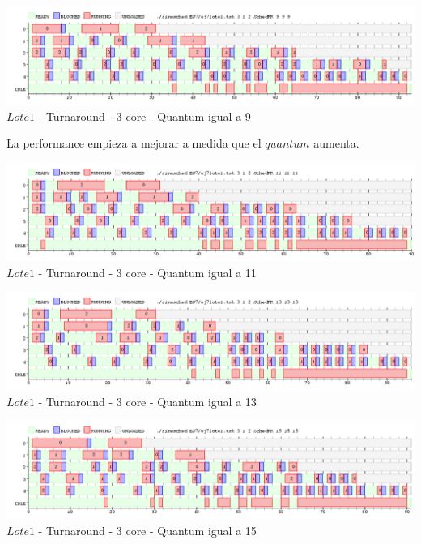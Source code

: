    \begin{center}
    	\includegraphics[width=450pt]{./EJ7/ej7tour3core4quan.png}
	{$Lote 1$ - Turnaround - 3 core - Quantum igual a 9}	
 \end{center}
 
 
 \indent La performance empieza a mejorar a medida que el $quantum$ aumenta.
 
   \begin{center}
    	\includegraphics[width=450pt]{./EJ7/ej7tour3core5quan.png}
	{$Lote 1$ - Turnaround - 3 core - Quantum igual a 11}	
 \end{center}
  
   \begin{center}
    	\includegraphics[width=450pt]{./EJ7/ej7tour7core6quan.png}
	{$Lote 1$ - Turnaround - 3 core - Quantum igual a 13}	
 \end{center}
 
 \begin{center}
    	\includegraphics[width=450pt]{./EJ7/ej7tour8core6quan.png}
	{$Lote 1$ - Turnaround - 3 core - Quantum igual a 15}	
 \end{center}
 
